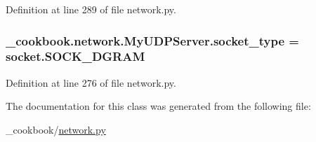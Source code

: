 Definition at line 289 of file network.\-py.

\hypertarget{class__cookbook_1_1network_1_1MyUDPServer_ad01d41f36b9e554d7ca247c3ab677511}{
\subsubsection[{socket\-\_\-type}]{\setlength{\rightskip}{0pt plus 5cm}\-\_\-cookbook.\-network.\-My\-U\-D\-P\-Server.\-socket\-\_\-type = socket.\-S\-O\-C\-K\-\_\-\-D\-G\-R\-A\-M\hspace{0.3cm}{\ttfamily [static]}}}\label{class__cookbook_1_1network_1_1MyUDPServer_ad01d41f36b9e554d7ca247c3ab677511}


Definition at line 276 of file network.\-py.



The documentation for this class was generated from the following file\-:\begin{DoxyCompactItemize}
\item 
\-\_\-cookbook/\hyperlink{network_8py}{network.\-py}\end{DoxyCompactItemize}
